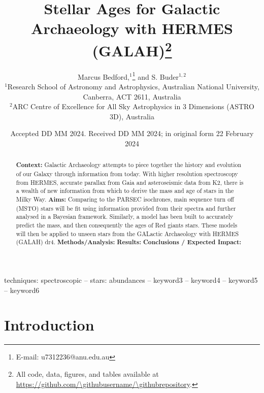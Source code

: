 \documentclass[fleqn,usenatbib]{mnras}
\title[Short title, max. 45 characters]{Stellar Ages for Galactic Archaeology with HERMES (GALAH)\thanks{All code, data, figures, and tables available at \url{https://github.com/\githubusername/\githubrepository}.}}
\author[M. Bedford et al.]{
Marcus Bedford,$^{1}$\thanks{E-mail: u7312236@anu.edu.au}
and S. Buder$^{1,2}$
\\
$^{1}$Research School of Astronomy and Astrophysics, Australian National University, Canberra, ACT 2611, Australia\\
$^{2}$ARC Centre of Excellence for All Sky Astrophysics in 3 Dimensions (ASTRO 3D), Australia
}
\date{Accepted DD MM 2024. Received DD MM 2024; in original form 22 February 2024}
\newcommand{\githubusername}{USERNAME}
\newcommand{\githubrepository}{REPOSITORY}
\begin{document}
\label{firstpage}
\pagerange{\pageref{firstpage}--\pageref{lastpage}}
\maketitle

\begin{abstract}
\textbf{Context:} Galactic Archaeology attempts to piece together the history and evolution of our Galaxy through information from today. With higher resolution spectroscopy from HERMES, accurate parallax from Gaia and asteroseismic data from K2, there is a wealth of new information from which to derive the mass and age of stars in the Milky Way. \newline
\textbf{Aims:} Comparing to the PARSEC isochrones, main sequence turn off (MSTO) stars will be fit using information provided from their spectra and further analysed in a Bayesian framework. Similarly, a model has been built to accurately predict the mass, and then consequently the ages of Red giants stars. These models will then be applied to unseen stars from the GALactic Archaeology with HERMES (GALAH) dr4.   \newline
\textbf{Methods/Analysis:} \newline
\textbf{Results:} \newline
\textbf{Conclusions / Expected Impact:} \newline
\href{https://github.com/\githubusername/\githubrepository}{\faGithub}
\end{abstract}

\begin{keywords}
techniques: spectroscopic -- stars: abundances -- keyword3 -- keyword4 -- keyword5 -- keyword6
\end{keywords}



\section{Introduction}
\end{document}
